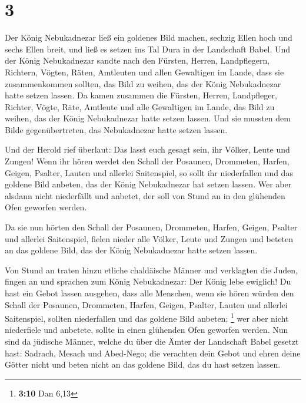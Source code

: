\hypertarget{section-2}{%
\section{3}\label{section-2}}

 Der König Nebukadnezar ließ ein goldenes Bild machen,
sechzig Ellen hoch und sechs Ellen breit, und ließ es setzen ins Tal
Dura in der Landschaft Babel.  Und der König Nebukadnezar
sandte nach den Fürsten, Herren, Landpflegern, Richtern, Vögten, Räten,
Amtleuten und allen Gewaltigen im Lande, dass sie zusammenkommen
sollten, das Bild zu weihen, das der König Nebukadnezar hatte setzen
lassen.  Da kamen zusammen die Fürsten, Herren,
Landpfleger, Richter, Vögte, Räte, Amtleute und alle Gewaltigen im
Lande, das Bild zu weihen, das der König Nebukadnezar hatte setzen
lassen. Und sie mussten dem Bilde gegenübertreten, das Nebukadnezar
hatte setzen lassen.

 Und der Herold rief überlaut: Das lasst euch gesagt sein,
ihr Völker, Leute und Zungen!  Wenn ihr hören werdet den
Schall der Posaunen, Drommeten, Harfen, Geigen, Psalter, Lauten und
allerlei Saitenspiel, so sollt ihr niederfallen und das goldene Bild
anbeten, das der König Nebukadnezar hat setzen lassen. 
Wer aber alsdann nicht niederfällt und anbetet, der soll von Stund an in
den glühenden Ofen geworfen werden.

 Da sie nun hörten den Schall der Posaunen, Drommeten,
Harfen, Geigen, Psalter und allerlei Saitenspiel, fielen nieder alle
Völker, Leute und Zungen und beteten an das goldene Bild, das der König
Nebukadnezar hatte setzen lassen.

 Von Stund an traten hinzu etliche chaldäische Männer und
verklagten die Juden,  fingen an und sprachen zum König
Nebukadnezar: Der König lebe ewiglich!  Du hast ein Gebot
lassen ausgehen, dass alle Menschen, wenn sie hören würden den Schall
der Posaunen, Drommeten, Harfen, Geigen, Psalter, Lauten und allerlei
Saitenspiel, sollten niederfallen und das goldene Bild anbeten;
\footnote{\textbf{3:10} Dan 6,13}  wer aber nicht
niederfiele und anbetete, sollte in einen glühenden Ofen geworfen
werden.  Nun sind da jüdische Männer, welche du über die
Ämter der Landschaft Babel gesetzt hast: Sadrach, Mesach und Abed-Nego;
die verachten dein Gebot und ehren deine Götter nicht und beten nicht an
das goldene Bild, das du hast setzen lassen.

